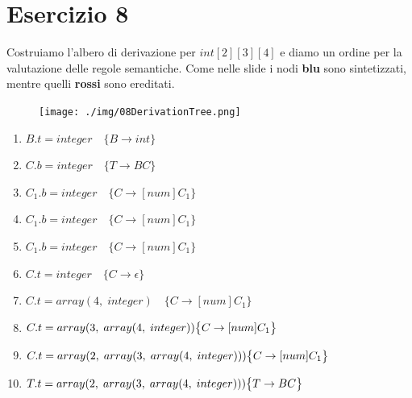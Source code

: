 \documentclass[11pt]{article}
\begin{document}
\section*{Esercizio 8}
Costruiamo l'albero di derivazione per $int[2][3][4]$ e diamo un ordine per la valutazione delle regole semantiche.
Come nelle slide i nodi {\color{blue} \textbf{blu}} sono sintetizzati, mentre quelli {\color {red} \textbf{rossi}} 
sono ereditati. 
\begin{center}
  \begin{minipage}[t]{\linewidth}
    \begin{multicols}{2}
      \begin{figure}[H]
        \texttt{[image: ./img/08DerivationTree.png]}
      \end{figure}
      \begin{enumerate}
        \small 
        \item $B.t = integer \quad \big \{B \rightarrow int\big\}$ 
        \item $C.b = integer \quad \big \{T \rightarrow BC\big\}$
        \item $C_1.b = integer \quad \big \{C \rightarrow [num]C_1\big\}$
        \item $C_1.b = integer \quad \big \{C \rightarrow [num]C_1\big\}$
        \item $C_1.b = integer \quad \big \{C \rightarrow [num]C_1\big\}$
        \item $C.t = integer \quad \big \{C \rightarrow \epsilon\big\}$
        \item $C.t = array(4,\; integer)\quad \big \{C \rightarrow [num]C_1\big\}$
        \item $C.t = array(3,\;array(4,\;integer)) \newline \big \{C \rightarrow [num]C_1\big\}$
        \item $C.t = array(2,\;array(3,\;array(4,\;integer)))
        \newline \big \{C \rightarrow [num]C_1\big\}$
        \item  $T.t = array(2,\;array(3,\;array(4,\;integer))) \newline \big \{T \rightarrow BC \big\}$
      \end{enumerate}
    \end{multicols}
  \end{minipage}
\end{center}
\end{document}
